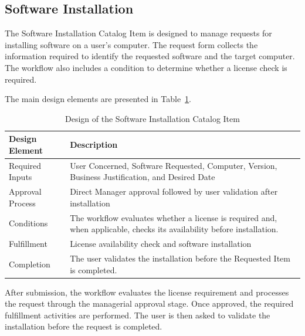 \documentclass[12pt,a4paper]{report}
\begin{document}
\subsection{Software Installation}
The Software Installation Catalog Item is designed to manage requests for
installing software on a user's computer. The request form collects the
information required to identify the requested software and the target
computer. The workflow also includes a condition to determine whether a
license check is required.

The main design elements are presented in
Table~\ref{tab:software-design}.

\begin{table}[H]
    \centering
    \renewcommand{\arraystretch}{1.3}
    \begin{tabularx}{\textwidth}{|
        >{\raggedright\arraybackslash}p{3.5cm}|X|}
        \hline
        \textbf{Design Element} & \textbf{Description} \\
        \hline

        Required Inputs &
        User Concerned, Software Requested, Computer, Version,
        Business Justification, and Desired Date \\
        \hline

        Approval Process &
        Direct Manager approval followed by user validation after
        installation \\
        \hline

        Conditions &
        The workflow evaluates whether a license is required and,
        when applicable, checks its availability before installation. \\
        \hline

        Fulfillment &
        License availability check and software installation \\
        \hline

        Completion &
        The user validates the installation before the Requested Item
        is completed. \\
        \hline

    \end{tabularx}
    \caption{Design of the Software Installation Catalog Item}
    \label{tab:software-design}
\end{table}

After submission, the workflow evaluates the license requirement and
processes the request through the managerial approval stage. Once approved,
the required fulfillment activities are performed. The user is then asked
to validate the installation before the request is completed.
\end{document}
